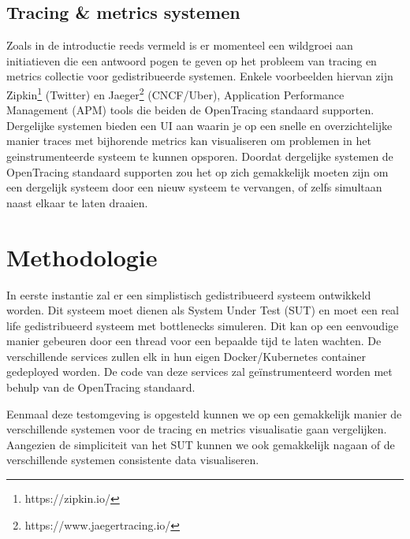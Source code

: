 \subsection{Tracing \& metrics systemen}
Zoals in de introductie reeds vermeld is er momenteel een wildgroei aan initiatieven die een antwoord pogen te geven op het probleem van tracing en metrics collectie voor gedistribueerde systemen. Enkele voorbeelden hiervan zijn Zipkin\footnote{https://zipkin.io/} (Twitter) en Jaeger\footnote{https://www.jaegertracing.io/} (CNCF/Uber), Application Performance Management (APM) tools die beiden de OpenTracing standaard supporten. Dergelijke systemen bieden een UI aan waarin je op een snelle en overzichtelijke manier traces met bijhorende metrics kan visualiseren om problemen in het geinstrumenteerde systeem te kunnen opsporen. Doordat dergelijke systemen de OpenTracing standaard supporten zou het op zich gemakkelijk moeten zijn om een dergelijk systeem door een nieuw systeem te vervangen, of zelfs simultaan naast elkaar te laten draaien.



\section{Methodologie}
\label{sec:methodologie}

In eerste instantie zal er een simplistisch gedistribueerd systeem ontwikkeld worden. Dit systeem moet dienen als System Under Test (SUT) en moet een real life gedistribueerd systeem met bottlenecks simuleren. Dit kan op een eenvoudige manier gebeuren door een thread voor een bepaalde tijd te laten wachten. De verschillende services zullen elk in hun eigen Docker/Kubernetes container gedeployed worden. De code van deze services zal geïnstrumenteerd worden met behulp van de OpenTracing standaard.

Eenmaal deze testomgeving is opgesteld kunnen we op een gemakkelijk manier de verschillende systemen voor de tracing en metrics visualisatie gaan vergelijken. Aangezien de simpliciteit van het SUT kunnen we ook gemakkelijk nagaan of de verschillende systemen consistente data visualiseren.

